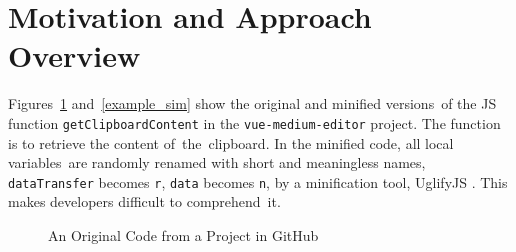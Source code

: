 \section{Motivation and Approach Overview}
\label{example_section}

Figures~\ref{example_org} and~\ref{example_sim} show the
original and minified versions~of the JS function
\texttt{get\-Clip\-board\-Content} in the \texttt{vue-medium-ed\-itor}
project.
%
The function is to retrieve the content of~the~clipboard. In the minified code, all local variables~are
randomly renamed with short and meaningless names, \eg
\texttt{data\-Transfer} becomes \texttt{r}, \texttt{data} becomes
\texttt{n}, by a minification tool, \eg UglifyJS \cite{uglify}. This
makes developers difficult to comprehend~it.

%
%

%

\begin{figure}[t]
\begin{center}

\caption{An Original Code from a Project in GitHub}
\label{example_org}
\end{center}
\end{figure}

